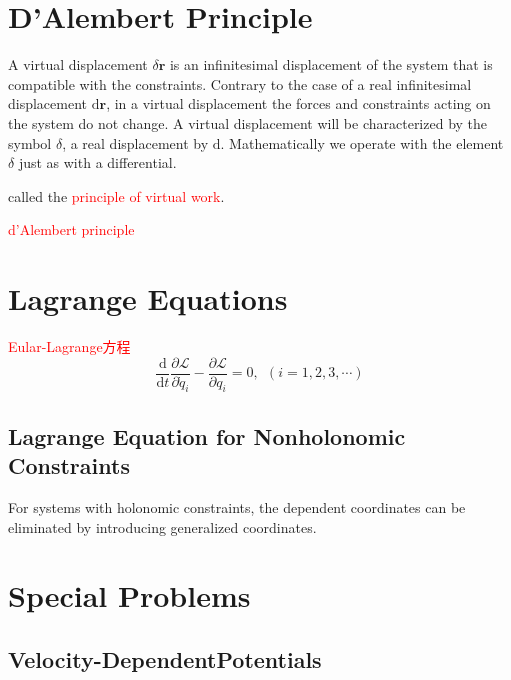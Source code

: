 \documentclass[11pt,a4paper]{article}
\renewcommand{\vec}[1]{\boldsymbol{#1}}
\newcommand{\dif}{\mathrm{d}}
\begin{document}
\section{D'Alembert Principle}
A virtual displacement $\delta \vec{r}$ is an infinitesimal displacement of the system that is compatible with the constraints. Contrary to the case of a real infinitesimal displacement $\dif \vec{r}$, in a virtual displacement the forces and constraints acting on the system do not change. A virtual displacement will be characterized by the symbol $\delta$, a real displacement by $\dif$. Mathematically we operate with the element $\delta$ just as with a differential. 




called the \textcolor{red}{principle of virtual work}. 





\textcolor{red}{d'Alembert principle}


\section{Lagrange Equations}








\textcolor{red}{Eular-Lagrange方程}
\begin{equation}
\frac{\dif }{\dif t} \frac{\partial \mathscr{L}}{\partial \dot{q}_i} -\frac{\partial \mathscr{L}}{\partial q_i} = 0, ~~ (i = 1, 2, 3, \cdots)
\end{equation}







\subsection{Lagrange Equation for Nonholonomic Constraints}
For systems with holonomic constraints, the dependent coordinates can be eliminated by introducing generalized coordinates.







\section{Special Problems}

\subsection{Velocity-DependentPotentials}
\end{document}
